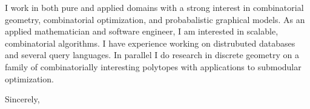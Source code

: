 \documentclass[11pt]{letter} %
\date{}
\begin{document}
\signature{Matthew Cadier Kim}
\setlength\parindent{24pt}                  %
 
\begin{letter}

I work in both pure and applied domains with a strong interest in combinatorial geometry, combinatorial optimization, and probabalistic graphical models. As an applied mathematician and software engineer, I am interested in scalable, combinatorial algorithms.  I have experience working on distrubuted databases and several query languages.  In parallel I do research in discrete geometry on a family of combinatorially interesting polytopes with applications to submodular optimization. 






    \closing{Sincerely,}
   
 
 

\end{letter}
 
 
\end{document}
